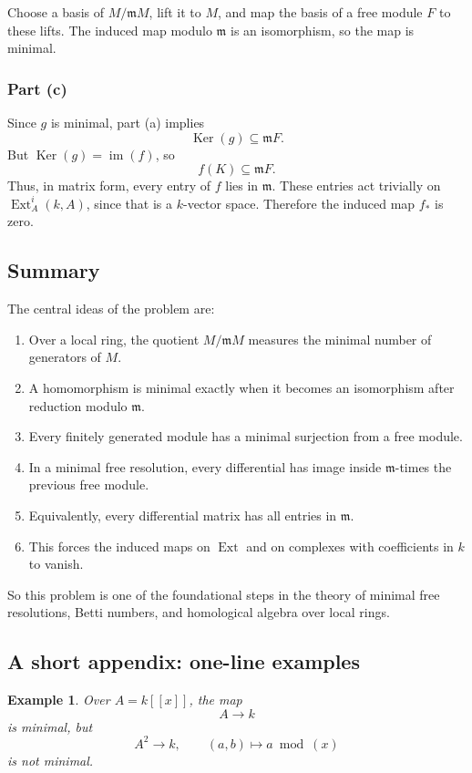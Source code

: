 \documentclass[12pt,a4paper]{article}
\theoremstyle{notespace}
\DeclareMathOperator{\Ker}{Ker}
\DeclareMathOperator{\Ext}{Ext}
\DeclareMathOperator{\im}{im}
\newtheorem{example}[definition]{Example}
\newcommand{\m}{\mathfrak m}
\begin{document}
Choose a basis of \(M/\m M\), lift it to \(M\), and map the basis of a free module \(F\) to these lifts. The induced map modulo \(\m\) is an isomorphism, so the map is minimal.

\subsubsection{Part (c)}

Since \(g\) is minimal, part (a) implies
\[
\Ker(g)\subseteq \m F.
\]
But \(\Ker(g)=\im(f)\), so
\[
f(K)\subseteq \m F.
\]
Thus, in matrix form, every entry of \(f\) lies in \(\m\). These entries act trivially on \(\Ext_A^i(k,A)\), since that is a \(k\)-vector space. Therefore the induced map \(f_*\) is zero.

\subsection{Summary}

The central ideas of the problem are:

\begin{enumerate}[leftmargin=2em]
	\item Over a local ring, the quotient \(M/\m M\) measures the minimal number of generators of \(M\).
	\item A homomorphism is minimal exactly when it becomes an isomorphism after reduction modulo \(\m\).
	\item Every finitely generated module has a minimal surjection from a free module.
	\item In a minimal free resolution, every differential has image inside \(\m\)-times the previous free module.
	\item Equivalently, every differential matrix has all entries in \(\m\).
	\item This forces the induced maps on \(\Ext\) and on complexes with coefficients in \(k\) to vanish.
\end{enumerate}

So this problem is one of the foundational steps in the theory of minimal free resolutions, Betti numbers, and homological algebra over local rings.

\subsection{A short appendix: one-line examples}

\begin{example}
	Over \(A=k[[x]]\), the map
	\[
	A\to k
	\]
	is minimal, but
	\[
	A^2\to k,\qquad (a,b)\mapsto a \bmod (x)
	\]
	is not minimal.
\end{example}
\end{document}
